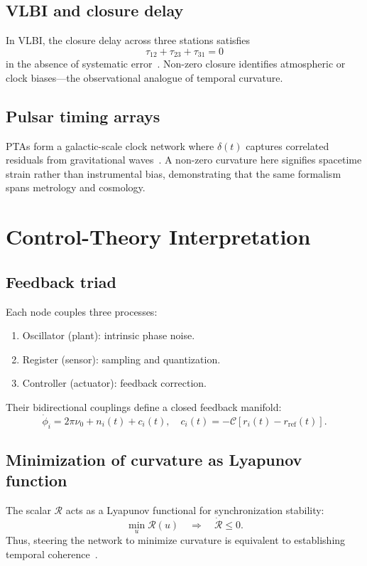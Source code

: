 \documentclass[11pt,a4paper]{article}
\begin{document}
\subsection{VLBI and closure delay}
In VLBI, the closure delay across three stations satisfies
\begin{equation}
\tau_{12} + \tau_{23} + \tau_{31} = 0
\end{equation}
in the absence of systematic error~\citep{Thompson2017}. 
Non-zero closure identifies atmospheric or clock biases—the observational analogue of temporal curvature.

\subsection{Pulsar timing arrays}
PTAs form a galactic-scale clock network where $\delta(t)$ captures correlated residuals from gravitational waves~\citep{Detweiler1979,NANOGrav2023}. 
A non-zero curvature here signifies spacetime strain rather than instrumental bias, demonstrating that the same formalism spans metrology and cosmology.

\section{Control-Theory Interpretation}

\subsection{Feedback triad}
Each node couples three processes:
\begin{enumerate}
\item Oscillator (plant): intrinsic phase noise.
\item Register (sensor): sampling and quantization.
\item Controller (actuator): feedback correction.
\end{enumerate}
Their bidirectional couplings define a closed feedback manifold:
\begin{equation}
\dot{\phi}_i = 2\pi\nu_0 + n_i(t) + c_i(t), \quad
c_i(t) = -\mathcal{C}[r_i(t)-r_\mathrm{ref}(t)].
\end{equation}

\subsection{Minimization of curvature as Lyapunov function}
The scalar $\mathcal{R}$ acts as a Lyapunov functional for synchronization stability:
\begin{equation}
\min_u \mathcal{R}(u) \quad \Rightarrow \quad \dot{\mathcal{R}} \le 0.
\end{equation}
Thus, steering the network to minimize curvature is equivalent to establishing temporal coherence~\citep{Astrom2008}.
\end{document}
